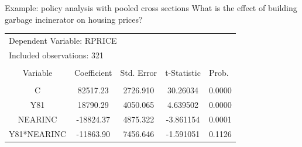 \documentclass[usenames,dvipsnames]{beamer}
\begin{document}
\begin{frame}{Example: policy analysis with pooled cross sections}
\footnotesize{What is the effect of building garbage incinerator on housing prices?}
\scriptsize
\begin{table}[]
\centering
\label{Tab21}
\begin{tabular}{lclcc}
\multicolumn{3}{l}{Dependent Variable: RPRICE}                                          &                      & \multicolumn{1}{l}{}      \\
\multicolumn{3}{l}{Included observations: 321}                                          &                      & \multicolumn{1}{l}{}      \\
                                &                      & \multicolumn{1}{c}{}           &                      & \multicolumn{1}{l}{}      \\
\multicolumn{1}{c}{Variable}    & Coefficient          & \multicolumn{1}{c}{Std. Error} & t-Statistic          & \multicolumn{1}{l}{Prob.} \\
                                
                                & \multicolumn{1}{l}{} &                                & \multicolumn{1}{l}{} & \multicolumn{1}{l}{}      \\
\multicolumn{1}{c}{C}           & 82517.23             & \multicolumn{1}{c}{2726.910}   & 30.26034             & 0.0000                    \\
\multicolumn{1}{c}{Y81}         & 18790.29             & \multicolumn{1}{c}{4050.065}   & 4.639502             & 0.0000                    \\
\multicolumn{1}{c}{NEARINC}     & -18824.37            & \multicolumn{1}{c}{4875.322}   & -3.861154            & 0.0001                    \\
\multicolumn{1}{c}{Y81*NEARINC} & -11863.90            & \multicolumn{1}{c}{7456.646}   & -1.591051            & 0.1126                    \\
                                

\end{tabular}
\end{table}
\end{frame}
\end{document}
